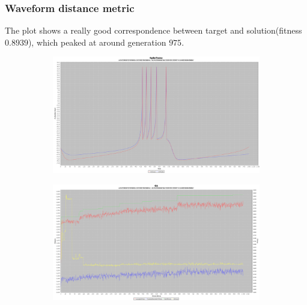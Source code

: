 \documentclass[10pt]{article}
\begin{document}
		\subsubsection{Waveform distance metric}
			The plot shows a really good correspondence between target and solution(fitness $0.8939$), which peaked at around generation $975$.
			\begin{figure}[H]
				\centering
					\begin{subfigure}{.5\textwidth}
						\centering
						\includegraphics[width=\linewidth]{./../images/izzy1/wave/plot.png}

						\label{fig:sub3a}
					\end{subfigure}%
					\begin{subfigure}{.5\textwidth}
						\centering
						\includegraphics[width=\linewidth]{./../images/izzy1/wave/prog.png}
						
						\label{fig:sub3b}
					\end{subfigure}
					
					\label{fig:plot3}
			\end{figure}
\end{document}
